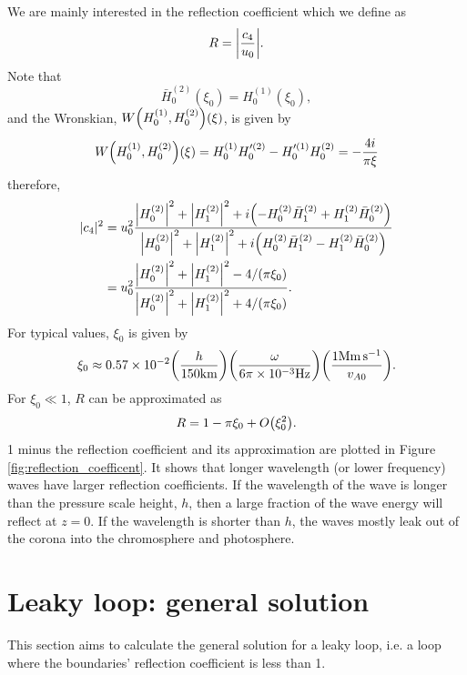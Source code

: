 We are mainly interested in the reflection coefficient which we define as 
\begin{equation}
    R = \abs{\frac{c_4}{u_0}}.
\end{equation}
Note that
\begin{equation}
    \bar{H}_0^{(2)}(\xi_0) = H_0^{(1)}(\xi_0),
\end{equation}
and the Wronskian, $W\qty(H_0^{(1)},H_0^{(2)})(\xi)$, is given by
\begin{equation}
    W\qty(H_0^{(1)},H_0^{(2)})(\xi)=H_0^{(1)}H_0'^{(2)}-H_0'^{(1)}H_0^{(2)}=-\frac{4i}{\pi \xi}
\end{equation}
therefore,
\begin{equation}
    \begin{aligned}
        |c_4|^2 &= u_0^2\frac{\abs{H_0^{(2)}}^2 + \abs{H_1^{(2)}}^2 + i\qty(-H_0^{(2)}\bar{H}_1^{(2)}+ H_1^{(2)}\bar{H}_0^{(2)})}{\abs{H_0^{(2)}}^2 + \abs{H_1^{(2)}}^2 + i\qty(H_0^{(2)}\bar{H}_1^{(2)}- H_1^{(2)}\bar{H}_0^{(2)})} \\
        &= u_0^2\frac{\abs{H_0^{(2)}}^2 + \abs{H_1^{(2)}}^2 - 4/(\pi\xi_0)}{\abs{H_0^{(2)}}^2 + \abs{H_1^{(2)}}^2 + 4/(\pi\xi_0)}.
    \end{aligned}
\end{equation}
For typical values, $\xi_0$ is given by
\[\xi_0\approx0.57\times10^{-2}\qty(\frac{h}{150\si{.km}})\qty(\frac{\omega}{6\pi\times10^{-3}\si{.Hz}})\qty(\frac{1\si{.Mm.s^{-1}}}{v_{A0}}).\]
For $\xi_0\ll 1$, $R$ can be approximated as
\begin{equation}
    \label{eq:reflection_coefficent_approximation}
    R = 1 - \pi \xi_0 + O\qty(\xi_0^2).
\end{equation}
1 minus the reflection coefficient and its approximation are plotted in Figure \ref{fig:reflection_coefficent}. It shows that longer wavelength (or lower frequency) waves have larger reflection coefficients. If the wavelength of the wave is longer than the pressure scale height, $h$, then a large fraction of the wave energy will reflect at $z=0$. If the wavelength is shorter than $h$, the waves mostly leak out of the corona into the chromosphere and photosphere.

\section{Leaky loop: general solution}
\label{sec:leaky_loop_general_solution}

This section aims to calculate the general solution for a leaky loop, i.e. a loop where the boundaries' reflection coefficient is less than 1.

